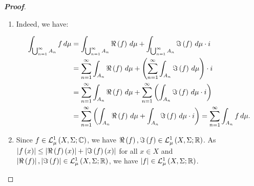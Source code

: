 \begin{proposition}
\begin{proof}[\rm\textbf{Proof}]
\begin{enumerate}
      Therefore, $f\in\LebC{A\cup B}{\Sigma_{A\cup B}}{\rest{\mu}{\Sigma_{A\cup B}}}$ and:

      \begin{equation}
        \begin{split}
          \int_{A\cup B}{f\,d\mu} & =\int_{A\cup B}{\Re\pr{f}\,d\mu}+\int_{A\cup B}{\Im\pr{f}\,d\mu}\cdot i\\
          &=\pr{\int_{A}{\Re\pr{f}\,d\mu}+\int_{B}{\Re\pr{f}\,d\mu}-\int_{A\cap B}{\Re\pr{f}\,d\mu}}\\
          &+\pr{\int_{A}{\Im\pr{f}\,d\mu}+\int_{B}{\Im\pr{f}\,d\mu}-\int_{A\cap B}{\Im\pr{f}\,d\mu}}\cdot i\\
          &=\pr{\int_{A}{\Re\pr{f}\,d\mu}+\int_{A}{\Im\pr{f}\,d\mu}\cdot i}+\pr{\int_{B}{\Re\pr{f}\,d\mu}+\int_{B}{\Im\pr{f}\,d\mu}\cdot i}\\
          &-\pr{\int_{A\cap B}{\Re\pr{f}\,d\mu}+\int_{A\cap B}{\Im\pr{f}\,d\mu}\cdot i}\\
          &=\int_{A}{f\,d\mu}+\int_{B}{f\,d\mu}-\int_{A\cap B}{f\,d\mu}.
        \end{split}
      \end{equation}
      \item Indeed, we have:
      
      \begin{equation}
        \begin{split}
          \int_{\bigcup_{n=1}^{\infty}{A_n}}{f\,d\mu} & =\int_{\bigcup_{n=1}^{\infty}{A_n}}{\Re\left(f\right)\,d\mu}+\int_{\bigcup_{n=1}^{\infty}{A_n}}{\Im\left(f\right)\,d\mu}\cdot i\\
          & =\sum_{n=1}^{\infty}{\int_{A_n}{\Re\left(f\right)\,d\mu}}+\left(\sum_{n=1}^{\infty}{\int_{A_n}{\Im\left(f\right)\,d\mu}}\right)\cdot i\\
          & =\sum_{n=1}^{\infty}{\int_{A_n}{\Re\left(f\right)\,d\mu}}+\sum_{n=1}^{\infty}{\left(\int_{A_n}{\Im\left(f\right)\,d\mu}\cdot i\right)}\\
          & =\sum_{n=1}^{\infty}{\left(\int_{A_n}{\Re\left(f\right)\,d\mu}+\int_{A_n}{\Im\left(f\right)\,d\mu}\cdot i\right)}=\sum_{n=1}^{\infty}{\int_{A_n}{f\,d\mu}}.
        \end{split}
      \end{equation}

      \item Since $f\in\mathcal{L}^1_{\mu}\left(X,\Sigma;\mathbb{C}\right)$, we have $\Re\left(f\right),\Im\left(f\right)\in\mathcal{L}^1_{\mu}\left(X,\Sigma;\mathbb{R}\right)$. As $\left|f\left(x\right)\right|\leq\left|\Re\left(f\right)\left(x\right)\right|+\left|\Im\left(f\right)\left(x\right)\right|$ for all $x\in X$ and $\left|\Re\left(f\right)\right|,\left|\Im\left(f\right)\right|\in\mathcal{L}^1_{\mu}\left(X,\Sigma;\mathbb{R}\right)$, we have $\left|f\right|\in\mathcal{L}^1_{\mu}\left(X,\Sigma;\mathbb{R}\right)$.
      

\end{enumerate}
\end{proof}
\end{proposition}

